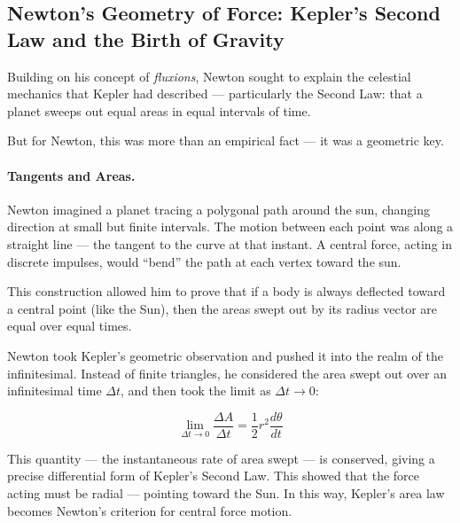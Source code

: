 \subsection{Newton’s Geometry of Force: Kepler’s Second Law and the Birth of Gravity}

Building on his concept of \textit{fluxions}, Newton sought to explain the celestial mechanics that Kepler had described — particularly the Second Law: that a planet sweeps out equal areas in equal intervals of time.

But for Newton, this was more than an empirical fact — it was a geometric key.

\paragraph{Tangents and Areas.} Newton imagined a planet tracing a polygonal path around the sun, changing direction at small but finite intervals. The motion between each point was along a straight line — the tangent to the curve at that instant. A central force, acting in discrete impulses, would “bend” the path at each vertex toward the sun.

This construction allowed him to prove that if a body is always deflected toward a central point (like the Sun), then the areas swept out by its radius vector are equal over equal times.

Newton took Kepler’s geometric observation and pushed it into the realm of the infinitesimal. Instead of finite triangles, he considered the area swept out over an infinitesimal time \( \Delta t \), and then took the limit as \( \Delta t \to 0 \):

\[
\lim_{\Delta t \to 0} \frac{\Delta A}{\Delta t} = \frac{1}{2} r^2 \frac{d\theta}{dt}
\]

This quantity — the instantaneous rate of area swept — is conserved, giving a precise differential form of Kepler’s Second Law. This showed that the force acting must be radial — pointing toward the Sun. In this way, Kepler’s area law becomes Newton’s criterion for central force motion.

